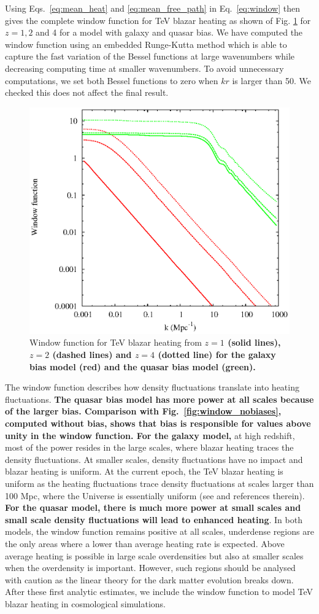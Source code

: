 \documentclass[twocolumns]{emulateapj}
\newcommand\ALc[1]{{\color{red} \bf #1}} %
\begin{document}
Using Eqs.~\ref{eq:mean_heat} and \ref{eq:mean_free_path} in Eq.~\ref{eq:window} then gives the complete window function for TeV blazar heating as shown of Fig. \ref{fig:window} for $z=1,2$ and 4 for a model with galaxy and quasar bias. We have computed the window function using an embedded Runge-Kutta method which is able to capture the fast variation of the Bessel functions at large wavenumbers while decreasing computing time at smaller wavenumbers. To avoid unnecessary computations, we set both Bessel functions to zero when $kr$ is larger than 50. We checked this does not affect the final result.

\begin{figure}[h]
  \centering
  \includegraphics[width = .45\textwidth ]{window_gal_qso}
  \caption{Window function for TeV blazar heating from \ALc{$z=1$ (solid lines), $z=2$ (dashed lines) and $z=4$ (dotted line) for the galaxy bias model (red) and the quasar bias model (green).}}
  \label{fig:window}
\end{figure}

The window function describes how density fluctuations translate into heating fluctuations. \ALc{The quasar  bias model has more power at all scales because of the larger bias. Comparison with Fig.~\ref{fig:window_nobiases}, computed without bias, shows that bias is responsible for values above unity in the window function. For the galaxy model,} at high redshift, most of the power resides in the large scales, where blazar heating traces the density fluctuations. At smaller scales, density fluctuations have no impact and blazar heating is uniform. At the current epoch,  the TeV blazar heating is uniform as the heating fluctuations trace density fluctuations at scales larger than 100 Mpc, where the Universe is essentially uniform  (see \citet{2013MNRAS.429.2910C} and references therein). \ALc{For the quasar model, there is much more power at small scales and small scale density fluctuations will lead to enhanced heating}. In both models, the window function remains positive at all scales, underdense regions are the only areas where a lower than average heating rate is expected. Above average  heating is possible in large scale overdensities but also at  smaller scales when the overdensity is important.  However, such regions should be analysed with caution as the linear theory for the dark matter evolution breaks down. After these first analytic estimates, we include the window function to model TeV blazar heating in cosmological simulations. 
\end{document}
